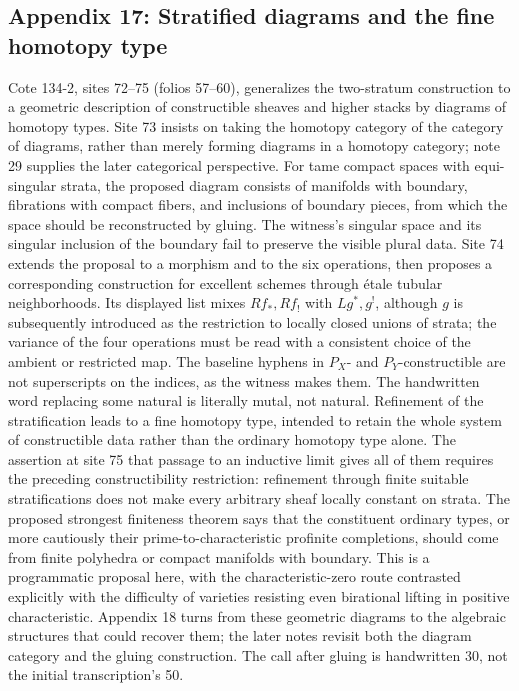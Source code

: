 \documentclass[10pt,oneside]{book}
\begin{document}
\subsection*{Appendix 17: Stratified diagrams and the fine homotopy type}
Cote 134-2, sites 72--75 (folios 57--60), generalizes the two-stratum construction to a geometric description of constructible sheaves and higher stacks by diagrams of homotopy types. Site 73 insists on taking the homotopy category of the category of diagrams, rather than merely forming diagrams in a homotopy category; note 29 supplies the later categorical perspective. For tame compact spaces with equi-singular strata, the proposed diagram consists of manifolds with boundary, fibrations with compact fibers, and inclusions of boundary pieces, from which the space should be reconstructed by gluing. The witness's singular space and its singular inclusion of the boundary fail to preserve the visible plural data. Site 74 extends the proposal to a morphism and to the six operations, then proposes a corresponding construction for excellent schemes through étale tubular neighborhoods. Its displayed list mixes $Rf_*,Rf_!$ with $Lg^*,g^!$, although $g$ is subsequently introduced as the restriction to locally closed unions of strata; the variance of the four operations must be read with a consistent choice of the ambient or restricted map. The baseline hyphens in $P_X$- and $P_Y$-constructible are not superscripts on the indices, as the witness makes them. The handwritten word replacing some natural is literally mutal, not natural. Refinement of the stratification leads to a fine homotopy type, intended to retain the whole system of constructible data rather than the ordinary homotopy type alone. The assertion at site 75 that passage to an inductive limit gives all of them requires the preceding constructibility restriction: refinement through finite suitable stratifications does not make every arbitrary sheaf locally constant on strata. The proposed strongest finiteness theorem says that the constituent ordinary types, or more cautiously their prime-to-characteristic profinite completions, should come from finite polyhedra or compact manifolds with boundary. This is a programmatic proposal here, with the characteristic-zero route contrasted explicitly with the difficulty of varieties resisting even birational lifting in positive characteristic. Appendix 18 turns from these geometric diagrams to the algebraic structures that could recover them; the later notes revisit both the diagram category and the gluing construction. The call after gluing is handwritten 30, not the initial transcription's 50.
\end{document}
